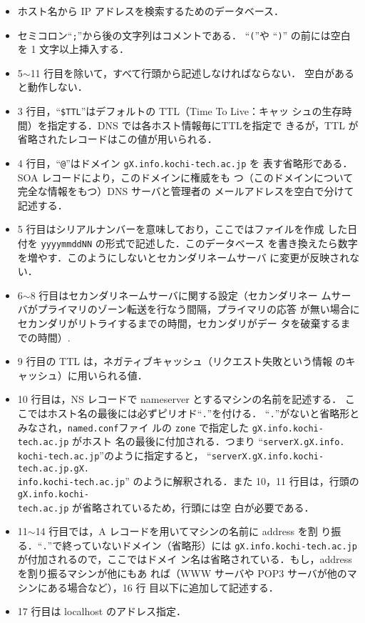 \begin{itemize}
\item ホスト名から IP アドレスを検索するためのデータベース．
\item セミコロン``\verb|;|''から後の文字列はコメントである．
``\verb|(|''や ``\verb|)|'' の前には空白を 1 文字以上挿入する．
\item 5$\sim$11 行目を除いて，すべて行頭から記述しなければならない．
空白があると動作しない．
\item 3 行目，``\verb|$TTL|''はデフォルトの TTL（Time To Live：キャッ%
シュの生存時間）を指定する．DNS では各ホスト情報毎にTTLを指定で
きるが，TTL が省略されたレコードはこの値が用いられる．
\item 4 行目，``\verb|@|''はドメイン \texttt{gX.info.kochi-tech.ac.jp} を
表す省略形である．SOA レコードにより，このドメインに権威をも
つ（このドメインについて完全な情報をもつ）DNS サーバと管理者の
メールアドレスを空白で分けて記述する．
\item 5 行目はシリアルナンバーを意味しており，ここではファイルを作成
した日付を \verb|yyyymmddNN| の形式で記述した．このデータベース
を書き換えたら数字を増やす．このようにしないとセカンダリネームサーバ
に変更が反映されない．
\item 6$\sim$8 行目はセカンダリネームサーバに関する設定（セカンダリネー
ムサーバがプライマリのゾーン転送を行なう間隔，プライマリの応答
が無い場合にセカンダリがリトライするまでの時間，セカンダリがデー
タを破棄するまでの時間）.
\item 9 行目の TTL は，ネガティブキャッシュ（リクエスト失敗という情報
のキャッシュ）に用いられる値．
\item 10 行目は，NS レコードで nameserver とするマシンの名前を記述する．
ここではホスト名の最後には必ずピリオド``\verb|.|''を付ける．
``\verb|.|''がないと省略形とみなされ，\verb|named.conf|ファイ
ルの \verb|zone| で指定した \texttt{gX.info.kochi-tech.ac.jp} がホスト
名の最後に付加される．つまり
``\texttt{serverX.gX.info.\\kochi-tech.ac.jp}''のように指定すると，
``\texttt{serverX.gX.info.kochi-tech.ac.jp.gX.\\info.kochi-tech.ac.jp}''
のように解釈される．また 10，11 行目は，行頭の %
\texttt{gX.info.kochi-\\tech.ac.jp} が省略されているため，行頭には空
白が必要である．
\item 11$\sim$14 行目では，A レコードを用いてマシンの名前に address を割
り振る．``\verb|.|''で終っていないドメイン（省略形）には %
\texttt{gX.info.kochi-tech.ac.jp} が付加されるので，ここではドメイ
ン名は省略されている．もし，address を割り振るマシンが他にもあ
れば（WWW サーバや POP3 サーバが他のマシンにある場合など），16 行
目以下に追加して記述する．
\item 17 行目は localhost のアドレス指定．
\end{itemize}
